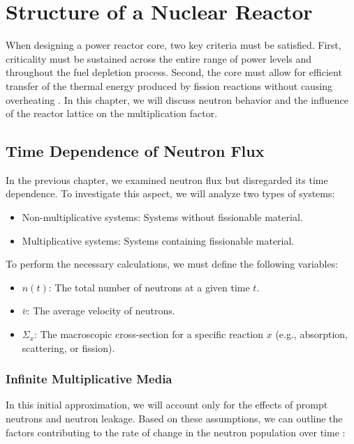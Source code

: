 \chapter{Structure of a Nuclear Reactor}

When designing a power reactor core, two key criteria must be satisfied. First, criticality must be sustained across the entire range of power levels and throughout the fuel depletion process. Second, the core must allow for efficient transfer of the thermal energy produced by fission reactions without causing overheating \cite{Lewis_2014}. In this chapter, we will discuss neutron behavior and the influence of the reactor lattice on the multiplication factor.

\section{Time Dependence of Neutron Flux}
In the previous chapter, we examined neutron flux but disregarded its time dependence. To investigate this aspect, we will analyze two types of systems:

\begin{itemize}
    \item Non-multiplicative systems: Systems without fissionable material.
    \item Multiplicative systems: Systems containing fissionable material.
\end{itemize}

To perform the necessary calculations, we must define the following variables:

\begin{itemize}
    \item $n(t)$: The total number of neutrons at a given time $t$.
    \item $\bar{v}$: The average velocity of neutrons.
    \item $\Sigma_{x}$: The macroscopic cross-section for a specific reaction $x$ (e.g., absorption, scattering, or fission).
\end{itemize}

\subsection{Infinite Multiplicative Media}

In this initial approximation, we will account only for the effects of prompt neutrons and neutron leakage. Based on these assumptions, we can outline the factors contributing to the rate of change in the neutron population over time \cite{Lewis_2014}:

